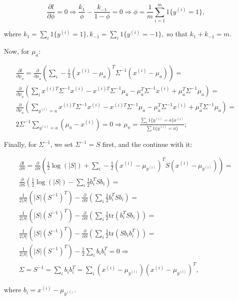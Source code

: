 \documentclass{article}
\begin{document}
\begin{enumerate}
$$
	\frac{\partial l}{\partial \phi} = 0 \Rightarrow \frac{k_1}{\phi} - \frac{k_{-1}}{1 - \phi} = 0 \Rightarrow \phi = \frac{1}{m} \sum_{i = 1}^m 1\{y^{(i)} = 1\},
$$

where $k_1 = \sum_i 1\{y^{(i)} = 1\}, k_{-1} = \sum_i 1\{y^{(i)} = -1\},$ so that $k_1 + k_{-1} = m.$

Now, for $\mu_a$:

\begin{eqnarray*}
	\frac{\partial l}{\partial {\mu_a}} = \frac{\partial}{\partial {\mu_a}} \left(\sum_i -\frac{1}{2}(x^{(i)} - \mu_a)^T \Sigma^{-1} (x^{(i)} - \mu_a) \right) = \\
	\frac{\partial}{\partial {\mu_a}} \left( \sum_i x^{(i)T} \Sigma^{-1} x^{(i)} - x^{(i)T} \Sigma^{-1} \mu_a - \mu_a^T \Sigma^{-1} x^{(i)} + \mu_a^T \Sigma^{-1} \mu_a \right) = \\
	\frac{\partial}{\partial {\mu_a}} \left( \sum_{y^{(i)} = a} x^{(i)T} \Sigma^{-1} x^{(i)} - x^{(i)T} \Sigma^{-1} \mu_a - \mu_a^T \Sigma^{-1} x^{(i)} + \mu_a^T \Sigma^{-1} \mu_a \right) = \\
	2\Sigma^{-1} \sum_{y^{(i)} = a} \left( \mu_a - x^{(i)} \right) = 0 \Rightarrow \mu_a = \frac{\sum_{i} 1\{y^{(i)} = a\} x^{(i)}}{\sum 1\{y^{(i)} = a\}};
\end{eqnarray*}

Finally, for $\Sigma^{-1}$, we set $\Sigma^{-1} = S$ first, and the continue with it:

\begin{eqnarray*}
	\frac{\partial l}{\partial S} = \frac{\partial}{\partial S} \left(\frac{1}{2}\log(|S|) + \sum_i - \frac{1}{2}(x^{(i)} - \mu_{y^{(i)}})^T S (x^{(i)} - \mu_{y^{(i)}}) \right) = \\
	\frac{\partial}{\partial S} \left(\frac{1}{2}\log(|S|) - \sum_i \frac{1}{2} b_{i}^T S b_{i} \right) = \\
	\frac{1}{2|S|}\left(|S|(S^{-1})^T\right) - \frac{\partial}{\partial S}\left( \sum_i \frac{1}{2} b_{i}^T S b_{i} \right) = \\
	\frac{1}{2|S|}\left(|S|(S^{-1})^T\right) - \frac{\partial}{\partial S}\left( \sum_i \frac{1}{2} \mathrm{tr}(b_{i}^T S b_{i})  \right) = \\
	\frac{1}{2|S|}\left(|S|(S^{-1})^T\right) - \frac{\partial}{\partial S}\left( \sum_i \frac{1}{2} \mathrm{tr}(S b_{i} b_{i}^T)  \right) = \\
	\frac{1}{2|S|}\left(|S|(S^{-1})^T\right) - \frac{1}{2}\sum_i b_{i} b_{i}^T = 0 \Rightarrow \\
	\Sigma = S^{-1} = \sum_i b_{i} b_{i}^T = \sum_i (x^{(i)} - \mu_{y^{(i)}})(x^{(i)} - \mu_{y^{(i)}})^T,
\end{eqnarray*}

where $b_i = x^{(i)} - \mu_{y^{(i)}}$.
\end{enumerate}
\end{document}
